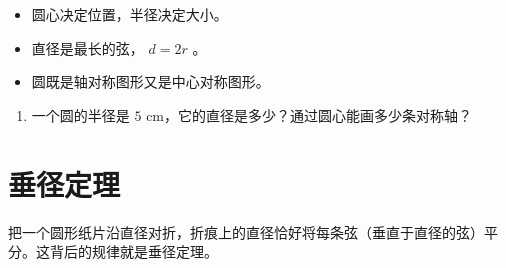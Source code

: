 \begin{keytakeaway}


\begin{itemize}
  \item 圆心决定位置，半径决定大小。
  \item 直径是最长的弦， $d = 2r$ 。
  \item 圆既是轴对称图形又是中心对称图形。
\end{itemize}


\end{keytakeaway}

\begin{practice}


\begin{enumerate}
  \item 一个圆的半径是 $5$ cm，它的直径是多少？通过圆心能画多少条对称轴？
\end{enumerate}


\end{practice}



\section*{垂径定理}


\begin{explore}


把一个圆形纸片沿直径对折，折痕上的直径恰好将每条弦（垂直于直径的弦）平分。这背后的规律就是垂径定理。

\end{explore}

